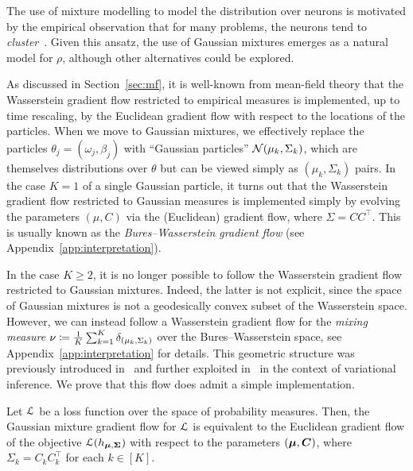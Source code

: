 \documentclass{custom}
\begin{document}
The use of mixture modelling to model the distribution over neurons is motivated by the empirical observation that for many problems, the neurons tend to \emph{cluster}~\citep[e.g.,][]{PapHanDon20NeuralCollapse, Che+23StochasticCollapse}.
Given this ansatz, the use of Gaussian mixtures emerges as a natural model for $\rho$, although other alternatives could be explored.

As discussed in Section~\ref{sec:mf}, it is well-known from mean-field theory that the Wasserstein gradient flow restricted to empirical measures is implemented, up to time rescaling, by the Euclidean gradient flow with respect to the locations of the particles.
When we move to Gaussian mixtures, we effectively replace the particles $\theta_j = (\omega_j, \beta_j)$ with ``Gaussian particles'' $\mathcal N(\mu_k,\Sigma_k)$, which are themselves distributions over $\theta$ but can be viewed simply as $(\mu_k,\Sigma_k)$ pairs.
In the case $K=1$ of a single Gaussian particle, it turns out that the Wasserstein gradient flow restricted to Gaussian measures is implemented simply by
evolving the parameters $(\mu,C)$ via the (Euclidean) gradient flow, where $\Sigma = CC^\top$.
This is usually known as the \emph{Bures--Wasserstein gradient flow} (see Appendix~\ref{app:interpretation}).

In the case $K\ge 2$, it is no longer possible to follow the Wasserstein gradient flow restricted to Gaussian mixtures.
Indeed, the latter is not explicit, since the space of Gaussian mixtures is not a geodesically convex subset of the Wasserstein space.
However, we can instead follow a Wasserstein gradient flow for the \emph{mixing measure} $\nu \coloneqq \frac{1}{K} \sum_{k=1}^K \delta_{(\mu_k,\Sigma_k)}$ over the Bures--Wasserstein space, see Appendix~\ref{app:interpretation} for details.
This geometric structure was previously introduced in~\citet{CheGeoTan19GMM, DelDes20GMM} and further exploited in~\cite{Lam+22GVI} in the context of variational inference.
We prove that this flow does admit a simple implementation.

\begin{theorem}[Informal]\label{thm:main_gmm}
    Let $\EuScript{L}$ be a loss function over the space of probability measures.
    Then, the Gaussian mixture gradient flow for $\EuScript{L}$ is equivalent to the Euclidean gradient flow of the objective $\EuScript{L}(h_{\boldsymbol \mu,\boldsymbol \Sigma})$ with respect to the parameters $(\boldsymbol \mu,\boldsymbol C)$, where $\Sigma_k = C_k C_k^\top$ for each $k\in [K]$.
\end{theorem}
\end{document}
